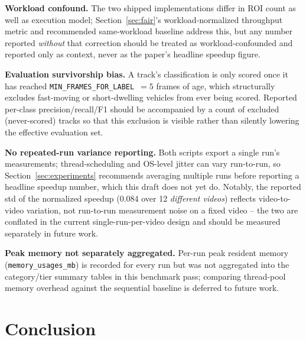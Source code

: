 \documentclass[conference]{IEEEtran}
\newcommand{\code}[1]{\texttt{#1}}
\begin{document}
\textbf{Workload confound.} The two shipped implementations differ in
ROI count as well as execution model; Section~\ref{sec:fair}'s
workload-normalized throughput metric and recommended same-workload
baseline address this, but any number reported \emph{without} that
correction should be treated as workload-confounded and reported only as
context, never as the paper's headline speedup figure.

\textbf{Evaluation survivorship bias.} A track's classification is only
scored once it has reached \code{MIN\_FRAMES\_FOR\_LABEL}~$=5$ frames of
age, which structurally excludes fast-moving or short-dwelling vehicles
from ever being scored. Reported per-class precision/recall/F1 should be
accompanied by a count of excluded (never-scored) tracks so that this
exclusion is visible rather than silently lowering the effective
evaluation set.

\textbf{No repeated-run variance reporting.} Both scripts export a
single run's measurements; thread-scheduling and OS-level jitter can
vary run-to-run, so Section~\ref{sec:experiments} recommends averaging
multiple runs before reporting a headline speedup number, which this
draft does not yet do. Notably, the reported std of the normalized
speedup (0.084 over 12 \emph{different videos}) reflects
video-to-video variation, not run-to-run measurement noise on a fixed
video -- the two are conflated in the current single-run-per-video
design and should be measured separately in future work.

\textbf{Peak memory not separately aggregated.} Per-run peak resident
memory (\code{memory\_usages\_mb}) is recorded for every run but was not
aggregated into the category/tier summary tables in this benchmark
pass; comparing thread-pool memory overhead against the sequential
baseline is deferred to future work.

\section{Conclusion}
\label{sec:conclusion}
\end{document}
